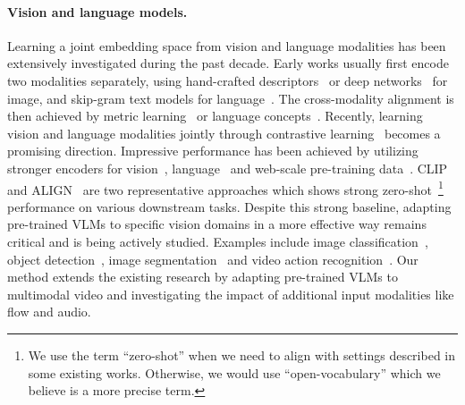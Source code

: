 \documentclass{article}
\begin{document}
\paragraph{Vision and language models.} 
Learning a joint embedding space from vision and language modalities has been extensively investigated during the past decade. 
Early works usually first encode two modalities separately, using hand-crafted descriptors~\cite{elhoseiny2013write} or deep networks~\cite{lei2015predicting} for image, and skip-gram text models for language~\cite{frome2013devise}. 
The cross-modality alignment is then achieved by metric learning~\cite{frome2013devise} or language concepts~\cite{li2017learning}. 
Recently, learning vision and language modalities jointly through contrastive learning~\cite{hadsell2006dimensionality, oord2018representation} becomes a promising direction. 
Impressive performance has been achieved by utilizing stronger encoders for vision~\cite{dosovitskiy2020image}, language~\cite{vaswani2017attention} and web-scale pre-training data~\cite{hinton2015distilling, radford2021learning}. 
CLIP~\cite{jia2021scaling} and ALIGN~\cite{radford2021learning} are two representative approaches which shows strong zero-shot~\footnote{We use the term ``zero-shot'' when we need to align with settings described in some existing works. Otherwise, we would use ``open-vocabulary'' which we believe is a more precise term.} performance on various downstream tasks. 
Despite this strong baseline, adapting pre-trained VLMs to specific vision domains in a more effective way remains critical and is being actively studied. 
Examples include image classification~\cite{zhou2021coop, zhou2022cocoop, gao2021clip}, object detection~\cite{gu2021open}, image segmentation~\cite{ghiasi2021open, li2022language} and video action recognition~\cite{wang2021actionclip, ju2021prompting}.
Our method extends the existing research by adapting pre-trained VLMs to multimodal video and investigating the impact of additional input modalities like flow and audio.
\end{document}

